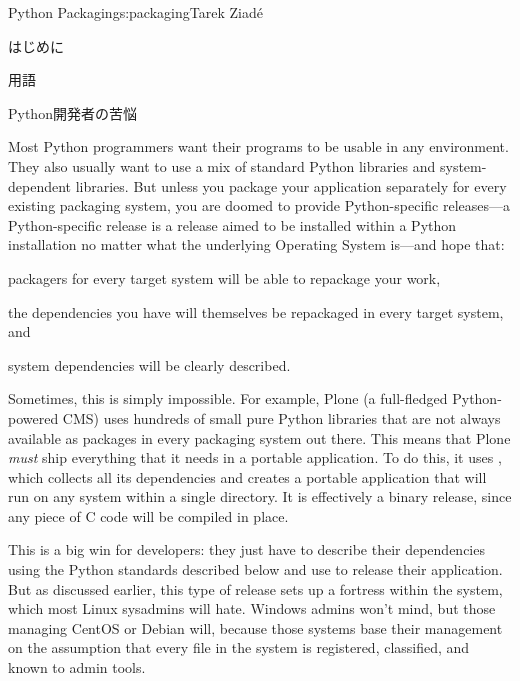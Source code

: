 \begin{aosachapter}{Python Packaging}{s:packaging}{Tarek Ziad\'{e}}
\begin{aosasect1}{はじめに}
\begin{aosabox}{用語}
\end{aosabox}

\end{aosasect1}

\begin{aosasect1}{Python開発者の苦悩}

Most Python programmers want their programs to be usable in any
environment.  They also usually want to use a mix of standard Python
libraries and system-dependent libraries.  But unless you package your
application separately for every existing packaging system, you are
doomed to provide Python-specific releases---a Python-specific release
is a release aimed to be installed within a Python installation no
matter what the underlying Operating System is---and hope that:

\begin{aosaitemize}

  \item packagers for every target system will be able to repackage
  your work,

  \item the dependencies you have will themselves be repackaged in
  every target system, and

  \item system dependencies will be clearly described.

\end{aosaitemize}

Sometimes, this is simply impossible.  For example, Plone (a
full-fledged Python-powered CMS) uses hundreds of small pure Python
libraries that are not always available as packages in every packaging
system out there.  This means that Plone \emph{must} ship everything
that it needs in a portable application. To do this, it uses
, which collects all its dependencies and creates a
portable application that will run on any system within a single
directory. It is effectively a binary release, since any piece of C
code will be compiled in place.

This is a big win for developers: they just have to describe their
dependencies using the Python standards described below
and use  to
release their application.  But as discussed earlier, this type of
release sets up a fortress within the system, which most Linux sysadmins
will hate.  Windows admins won't mind, but those managing
CentOS or Debian will, because those systems base their management on
the assumption that every file in the system is registered,
classified, and known to admin tools.


\end{aosasect1}
\end{aosachapter}
